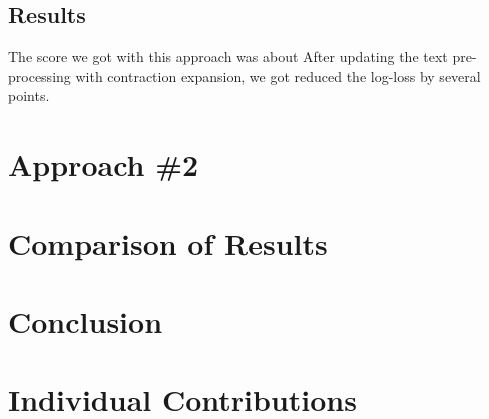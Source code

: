\documentclass{article}
\begin{document}
\subsection{Results}

The score we got with this approach was about %
After updating the text pre-processing with contraction expansion,
we got reduced the log-loss by several points.

\section{Approach \#2}

\section{Comparison of Results}

\section{Conclusion}

\appendix
\section*{Individual Contributions}
\end{document}
